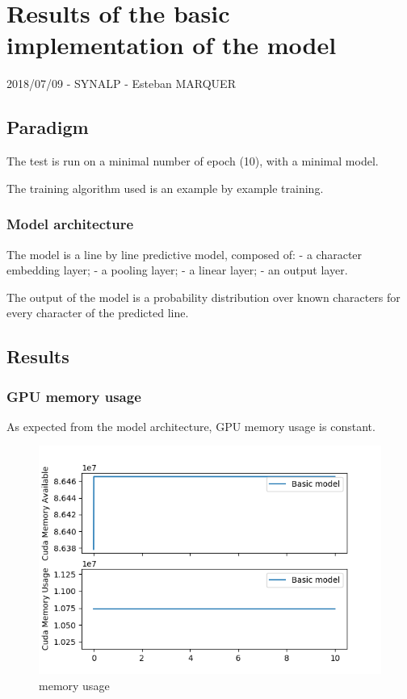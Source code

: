 \section*{Results of the basic implementation of the
model}

2018/07/09 - SYNALP - Esteban MARQUER

\subsection{Paradigm}

The test is run on a minimal number of epoch (10), with a minimal model.

The training algorithm used is an example by example training.

\subsubsection{Model architecture}

The model is a line by line predictive model, composed of: - a character
embedding layer; - a pooling layer; - a linear layer; - an output layer.

The output of the model is a probability distribution over known
characters for every character of the predicted line.

\subsection{Results}

\subsubsection{GPU memory usage}

As expected from the model architecture, GPU memory usage is constant.

\begin{figure}[ht]
\centering
\includegraphics{parts/appendix/reports-papud/2018_07_09-Basic_implementation_results/memory.png}
\caption{memory usage}
\end{figure}

